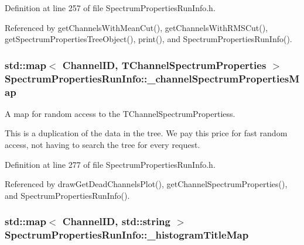Definition at line 257 of file Spectrum\-Properties\-Run\-Info.\-h.



Referenced by get\-Channels\-With\-Mean\-Cut(), get\-Channels\-With\-R\-M\-S\-Cut(), get\-Spectrum\-Properties\-Tree\-Object(), print(), and Spectrum\-Properties\-Run\-Info().

\hypertarget{class_spectrum_properties_run_info_a673b97ff771527ce85493856e80e7b83}{
\subsubsection[{\-\_\-channel\-Spectrum\-Properties\-Map}]{\setlength{\rightskip}{0pt plus 5cm}std\-::map$<$ {\bf Channel\-I\-D}, {\bf T\-Channel\-Spectrum\-Properties} $>$ Spectrum\-Properties\-Run\-Info\-::\-\_\-channel\-Spectrum\-Properties\-Map\hspace{0.3cm}{\ttfamily [protected]}}}\label{class_spectrum_properties_run_info_a673b97ff771527ce85493856e80e7b83}


A map for random access to the T\-Channel\-Spectrum\-Propertiess. 

This is a duplication of the data in the tree. We pay this price for fast random access, not having to search the tree for every request. 

Definition at line 277 of file Spectrum\-Properties\-Run\-Info.\-h.



Referenced by draw\-Get\-Dead\-Channels\-Plot(), get\-Channel\-Spectrum\-Properties(), and Spectrum\-Properties\-Run\-Info().

\hypertarget{class_spectrum_properties_run_info_a9e75eca5cf3a61ec892a62862d159111}{
\subsubsection[{\-\_\-histogram\-Title\-Map}]{\setlength{\rightskip}{0pt plus 5cm}std\-::map$<$ {\bf Channel\-I\-D}, std\-::string $>$ Spectrum\-Properties\-Run\-Info\-::\-\_\-histogram\-Title\-Map\hspace{0.3cm}{\ttfamily [protected]}}}\label{class_spectrum_properties_run_info_a9e75eca5cf3a61ec892a62862d159111}


